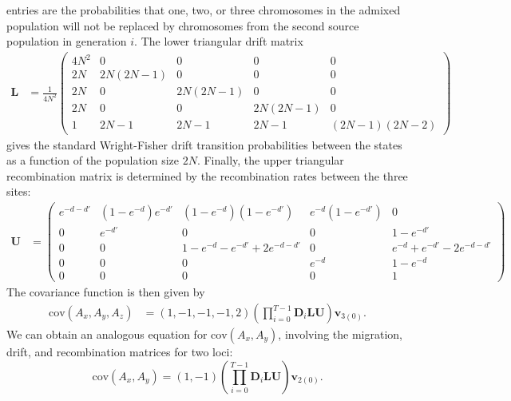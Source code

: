 \documentclass[10pt]{article}
\begin{document}
entries are the probabilities that one, two, or three chromosomes in the admixed
population will not be replaced by chromosomes from the second source population
in generation $i$. The lower triangular drift matrix \begin{align*}
\mathbf{L}&=\frac{1}{4N^2}\left( \begin{array}{ccccc} 4N^2 		& 0 	& 0 & 0 & 0\\
2N 	& 2N(2N-1) & 0 & 0 & 0\\ 2N 	& 0 & 2N(2N-1) & 0 & 0\\ 2N 	& 0 & 0 & 2N(2N-1) &
0\\ 1 & 2N-1 & 2N-1 & 2N-1 & (2N-1)(2N-2) \end{array} \right) \end{align*} gives
the standard Wright-Fisher drift transition probabilities between the states as
a function of the population size $2N$. Finally, the upper triangular
recombination matrix is determined by the recombination rates between the three
sites: \begin{align*} \mathbf{U} &= \left( \begin{array}{ccccc} e^{-d-d'} &
(1-e^{-d})e^{-d'} & (1-e^{-d})(1-e^{-d'}) & e^{-d}(1-e^{-d'}) & 0 \\ 0 & e^{-d'} &
0 & 0 & 1-e^{-d'} \\ 0 & 0 & 1-e^{-d}-e^{-d'}+2e^{-d-d'} & 0 &
e^{-d}+e^{-d'}-2e^{-d-d'} \\ 0 & 0 & 0 & e^{-d} & 1-e^{-d} \\ 0 & 0 & 0 & 0 & 1
\end{array} \right) \end{align*} The covariance function is then given by
\begin{align} \text{cov}(A_x,A_y,A_z) &=
\left(1,-1,-1,-1,2\right)\left(\prod_{i=0}^{T-1} \textbf{D}_i
\mathbf{L}\mathbf{U}\right)\textbf{v}_{3(0)}. \label{cov} \end{align} We can
obtain an analogous equation for $\text{cov}(A_x,A_y)$, involving the migration,
drift, and recombination matrices for two loci: $$ \text{cov}(A_x,A_y) =
\left(1,-1\right)\left(\prod_{i=0}^{T-1} \textbf{D}_i
\mathbf{L}\mathbf{U}\right)\textbf{v}_{2(0)}. $$
\end{document}
